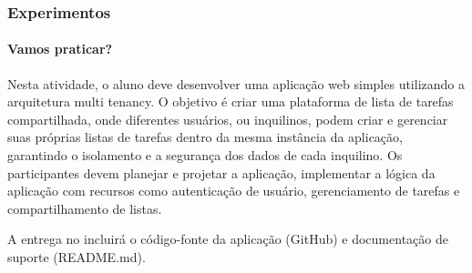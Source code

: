 \documentclass[
	9pt, %
	t, %
]{beamer}
\begin{document}
\begin{frame}
	\frametitle{Experimentos}
	\framesubtitle{Vamos praticar?}

	Nesta atividade, o aluno deve desenvolver uma aplicação web simples utilizando a arquitetura multi tenancy. O objetivo é criar uma plataforma de lista de tarefas compartilhada, onde diferentes usuários, ou inquilinos, podem criar e gerenciar suas próprias listas de tarefas dentro da mesma instância da aplicação, garantindo o isolamento e a segurança dos dados de cada inquilino. Os participantes devem planejar e projetar a aplicação, implementar a lógica da aplicação com recursos como autenticação de usuário, gerenciamento de tarefas e compartilhamento de listas.
	
	\bigskip
	
	A entrega no incluirá o código-fonte da aplicação (GitHub) e documentação de suporte (README.md).

\end{frame}
\end{document}
